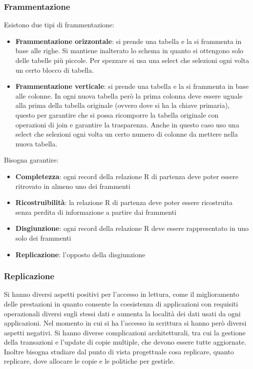 \subsubsection{Frammentazione}
Esistono due tipi di frammentazione:
\begin{itemize}
    \item \textbf{Frammentazione orizzontale}: si prende una tabella e la si
          frammenta in base alle righe. Si mantiene inalterato lo schema in
          quanto si ottengono solo delle tabelle più piccole. Per spezzare si
          usa una select che selezioni ogni volta un certo blocco di tabella.
    \item \textbf{Frammentazione verticale}: si prende una tabella e la si frammenta
          in base alle colonne. In ogni nuova tabella però la prima colonna
          deve essere uguale alla prima della tabella originale (ovvero dove si
          ha la chiave primaria), questo per garantire che si possa ricomporre
          la tabella originale con operazioni di join e garantire la
          trasparenza. Anche in questo caso uso una select che selezioni ogni
          volta un certo numero di colonne da mettere nella nuova tabella.
\end{itemize}
Bisogna garantire:
\begin{itemize}
    \item \textbf{Completezza}: ogni record della relazione R di partenza
          deve poter essere ritrovato in almeno uno dei frammenti
    \item \textbf{Ricostruibilità}: la relazione R di partenza deve poter essere
          ricostruita senza perdita di informazione a partire dai frammenti
    \item \textbf{Disgiunzione}: ogni record della relazione R deve essere
          rappresentato in uno solo dei frammenti
    \item \textbf{Replicazione}: l'opposto della disgiunzione
\end{itemize}
\subsubsection{Replicazione}
Si hanno diversi aspetti positivi per l'accesso in lettura, come il miglioramento
delle prestazioni in quanto consente la coesistenza di applicazioni con requisiti
operazionali diversi sugli stessi dati e aumenta la località dei dati usati da
ogni applicazioni. Nel momento in cui si ha l'accesso in scrittura si hanno però
diversi aspetti negativi. Si hanno diverse complicazioni architetturali, tra cui
la gestione della transazioni e l'update di copie multiple, che devono essere
tutte aggiornate. Inoltre bisogna studiare dal punto di vista progettuale cosa
replicare, quanto replicare, dove allocare le copie e le politiche per gestirle.

